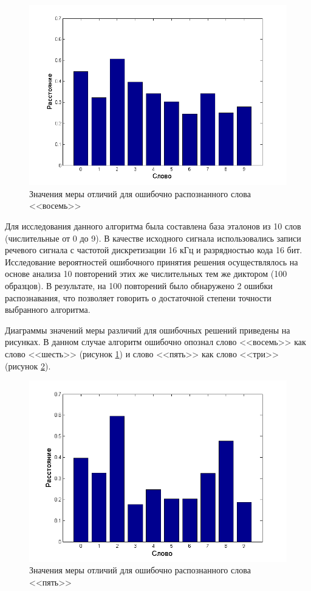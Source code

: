 \documentclass[a4paper,14pt,russian,utf8,nocolumnsxix,nocolumnxxxi,nocolumnxxxii]{eskdtext}
\begin{document}
\begin{figure}[H]	
	\centering
	\includegraphics[width=120mm]{err_8.png}			
	\caption{Значения меры отличий для ошибочно распознанного слова <<восемь>>}
	\label{dist_error8}
\end{figure}

Для исследования данного алгоритма была составлена база эталонов из 10 слов (числительные от 0 до 9). В качестве исходного сигнала использовались записи речевого сигнала с частотой дискретизации 16 кГц и разрядностью кода 16 бит. Исследование вероятностей ошибочного принятия решения осуществлялось на основе анализа 10 повторений этих же числительных тем же диктором (100 образцов). В результате, на 100 повторений было обнаружено 2 ошибки распознавания, что позволяет говорить о достаточной степени точности выбранного алгоритма.

Диаграммы значений меры различий для ошибочных решений приведены на рисунках. В данном случае алгоритм ошибочно опознал слово <<восемь>> как слово <<шесть>> (рисунок \ref{dist_error8}) и слово  <<пять>> как слово <<три>> (рисунок \ref{dist_error5}).




\begin{figure}[h]	
	\centering
	\includegraphics[width=120mm]{err_5.png}			
	\caption{Значения меры отличий для ошибочно распознанного слова <<пять>>}
	\label{dist_error5}
\end{figure}
\end{document}
